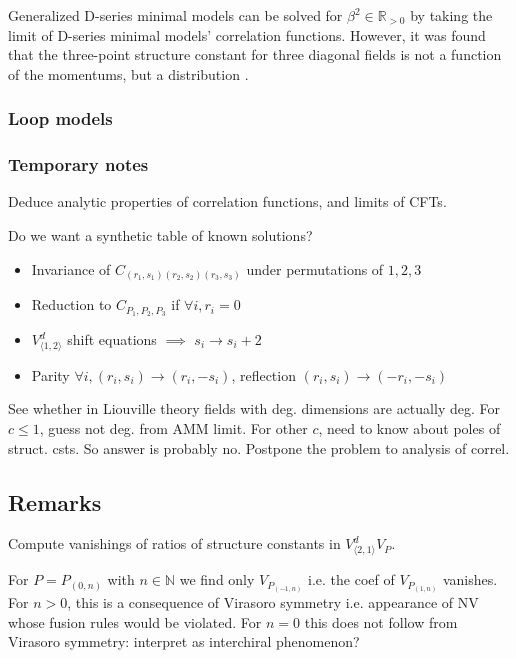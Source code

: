 \documentclass[12pt, a4paper]{article}
\theoremstyle{break}
\begin{document}
Generalized D-series minimal models can be solved for $\beta^2\in \mathbb{R}_{>0}$ by taking the limit of D-series minimal models' correlation functions. However, it was found that the three-point structure constant for three diagonal fields is not a function of the momentums, but a distribution \cite{rib19}. 


\subsubsection{Loop models}


\subsubsection{Temporary notes}

Deduce analytic properties of correlation functions, and limits of CFTs. 

Do we want a synthetic table of known solutions? 

\begin{itemize}
\item Invariance of $C_{(r_1,s_1)(r_2,s_2)(r_3,s_3)}$ under permutations of $1,2,3$
\item Reduction to $C_{P_1,P_2,P_3}$ if $\forall i, r_i=0$ 
 \item $V_{\langle 1,2\rangle}^d$ shift equations $\implies$ $s_i\to s_i+2$  
 \item Parity $\forall i, (r_i,s_i)\to (r_i,-s_i)$, reflection $(r_i,s_i)\to (-r_i,-s_i)$
\end{itemize}


See whether in Liouville theory fields with deg. dimensions are actually deg. For $c\leq 1$, guess not deg. from AMM limit. For other $c$, need to know about poles of struct. csts. So answer is probably no. Postpone the problem to analysis of correl. 

\subsection{Remarks}

Compute vanishings of ratios of structure constants in $V^d_{\langle 2,1\rangle}V_P$. 

For $P=P_{(0,n)}$ with $n\in\mathbb{N}$ we find only $V_{P_{(-1,n)}}$ i.e. the coef of $V_{P_{(1,n)}}$ vanishes. For $n>0$, this is a consequence of Virasoro symmetry i.e. appearance of NV whose fusion rules would be violated. For $n=0$ this does not follow from Virasoro symmetry: interpret as interchiral phenomenon?
\end{document}
